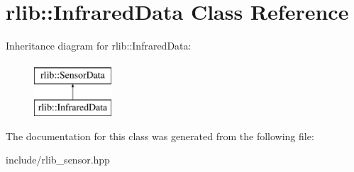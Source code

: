 \hypertarget{classrlib_1_1InfraredData}{\section{rlib\-:\-:Infrared\-Data Class Reference}
\label{classrlib_1_1InfraredData}
}
Inheritance diagram for rlib\-:\-:Infrared\-Data\-:\begin{figure}[H]
\begin{center}
\leavevmode
\includegraphics[height=2.000000cm]{classrlib_1_1InfraredData}
\end{center}
\end{figure}


The documentation for this class was generated from the following file\-:\begin{DoxyCompactItemize}
\item 
include/rlib\-\_\-sensor.\-hpp\end{DoxyCompactItemize}
